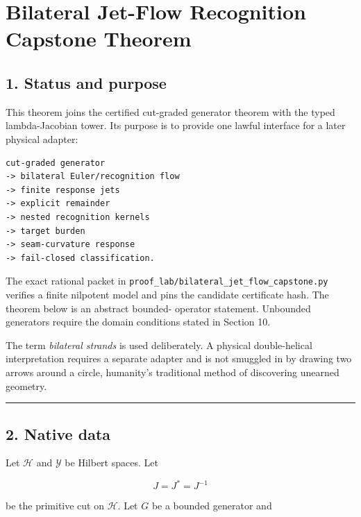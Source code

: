 \hypertarget{bilateral-jet-flow-recognition-capstone-theorem}{%
\chapter{Bilateral Jet-Flow Recognition Capstone Theorem}\label{bilateral-jet-flow-recognition-capstone-theorem}}

\hypertarget{status-and-purpose}{%
\section{1. Status and purpose}\label{status-and-purpose}}

This theorem joins the certified cut-graded generator theorem with the typed
lambda-Jacobian tower. Its purpose is to provide one lawful interface for a
later physical adapter:

\begin{verbatim}
cut-graded generator
-> bilateral Euler/recognition flow
-> finite response jets
-> explicit remainder
-> nested recognition kernels
-> target burden
-> seam-curvature response
-> fail-closed classification.
\end{verbatim}

The exact rational packet in
\texttt{proof\_lab/bilateral\_jet\_flow\_capstone.py} verifies a finite nilpotent model and
pins the candidate certificate hash. The theorem below is an abstract bounded-
operator statement. Unbounded generators require the domain conditions stated
in Section 10.

The term \emph{bilateral strands} is used deliberately. A physical double-helical
interpretation requires a separate adapter and is not smuggled in by drawing
two arrows around a circle, humanity's traditional method of discovering
unearned geometry.

\begin{center}\rule{0.5\linewidth}{0.5pt}\end{center}

\hypertarget{native-data}{%
\section{2. Native data}\label{native-data}}

Let \(\mathcal H\) and \(\mathcal Y\) be Hilbert spaces. Let

\[
J=J^*=J^{-1}
\]

be the primitive cut on \(\mathcal H\). Let \(G\) be a bounded generator and

